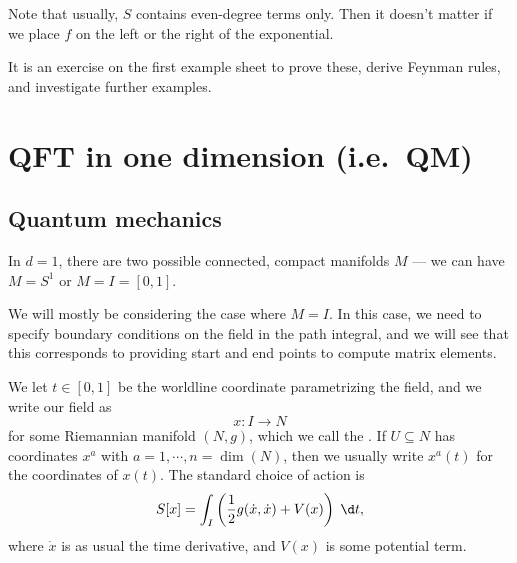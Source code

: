 \documentclass[a4paper]{article}
\begin{document}
Note that usually, $S$ contains even-degree terms only. Then it doesn't matter if we place $f$ on the left or the right of the exponential.

It is an exercise on the first example sheet to prove these, derive Feynman rules, and investigate further examples.
\section{QFT in one dimension (\texorpdfstring{i.e.\ }{i.e. }QM)}
\subsection{Quantum mechanics}
In $d = 1$, there are two possible connected, compact manifolds $M$ --- we can have $M = S^1$ or $M = I = [0, 1]$.
\begin{center}
\end{center}
We will mostly be considering the case where $M = I$. In this case, we need to specify boundary conditions on the field in the path integral, and we will see that this corresponds to providing start and end points to compute matrix elements.

We let $t \in [0, 1]$ be the worldline coordinate parametrizing the field, and we write our field as
\[
  x: I \to N
\]
for some Riemannian manifold $(N, g)$, which we call the . If $U\subseteq N$ has coordinates $x^a$ with $a = 1, \cdots, n = \dim (N)$, then we usually write $x^a(t)$ for the coordinates of $x(t)$. The standard choice of action is
\[
  S[x] = \int_I \left(\frac{1}{2} g(\dot{x}, \dot{x}) + V(x)\right)\;\d t,
\]
where $\dot{x}$ is as usual the time derivative, and $V(x)$ is some potential term.
\end{document}
